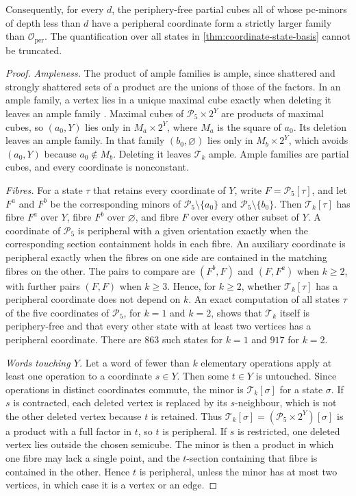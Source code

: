\documentclass[11pt]{article}
\theoremstyle{definition}
\theoremstyle{remark}
\newcommand{\Oper}{\mathcal O_{\mathrm{per}}}
\begin{document}
Consequently, for every \(d\), the periphery-free partial cubes all of whose
pc-minors of depth less than \(d\) have a peripheral coordinate form a
strictly larger family than \(\Oper\).  The
quantification over all states in \cref{thm:coordinate-state-basis} cannot
be truncated.

\begin{proof}
\emph{Ampleness.}  The product of ample families is ample, since
shattered and strongly shattered sets of a product are the unions of
those of the factors.  In an ample family, a vertex lies in a unique
maximal cube exactly when deleting it leaves an ample family
\cite[Lemma~4.1]{ChalopiChepoiMoran22}.  Maximal cubes of
\(\mathcal P_5\times2^Y\) are products of maximal cubes, so \((a_0,Y)\)
lies only in \(M_a\times2^Y\), where \(M_a\) is the square of \(a_0\).  Its
deletion leaves an ample family.  In that family \((b_0,\varnothing)\) lies
only in \(M_b\times2^Y\), which avoids \((a_0,Y)\) because
\(a_0\notin M_b\).  Deleting it leaves \(\mathcal T_k\) ample.  Ample
families are partial cubes, and every coordinate is nonconstant.

\emph{Fibres.}  For a state \(\tau\) that retains every coordinate of
\(Y\), write \(F=\mathcal P_5[\tau]\), and let \(F^a\) and \(F^b\) be the
corresponding minors of \(\mathcal P_5\setminus\{a_0\}\) and
\(\mathcal P_5\setminus\{b_0\}\).  Then \(\mathcal T_k[\tau]\) has fibre
\(F^a\) over \(Y\), fibre \(F^b\) over \(\varnothing\), and fibre \(F\)
over every other subset of \(Y\).  A coordinate of \(\mathcal P_5\) is
peripheral with a given orientation exactly when the corresponding section
containment holds in each fibre.  An auxiliary coordinate is peripheral
exactly when the fibres on one side are contained in the matching fibres
on the other.  The pairs to compare are \((F^b,F)\) and \((F,F^a)\) when
\(k\ge2\), with further pairs \((F,F)\) when \(k\ge3\).  Hence, for
\(k\ge2\), whether \(\mathcal T_k[\tau]\) has a peripheral coordinate does
not depend on \(k\).  An exact computation of all states \(\tau\) of the
five coordinates of \(\mathcal P_5\), for \(k=1\) and \(k=2\), shows that
\(\mathcal T_k\) itself is periphery-free and that every other state with
at least two vertices has a peripheral coordinate.  There are \(863\) such
states for \(k=1\) and \(917\) for \(k=2\).

\emph{Words touching \(Y\).}  Let a word of fewer than \(k\) elementary
operations apply at least one operation to a coordinate \(s\in Y\).  Then
some \(t\in Y\) is untouched.  Since operations in distinct coordinates
commute, the minor is \(\mathcal T_k[\sigma]\) for a state \(\sigma\).  If
\(s\) is contracted, each deleted vertex is replaced by its
\(s\)-neighbour, which is not the other deleted vertex because \(t\) is
retained.  Thus \(\mathcal T_k[\sigma]=(\mathcal P_5\times2^Y)[\sigma]\) is a
product with a full factor in \(t\), so \(t\) is peripheral.  If \(s\) is
restricted, one deleted vertex lies outside the chosen semicube.  The
minor is then a product in which one fibre may lack a single point, and
the \(t\)-section containing that fibre is contained in the other.  Hence
\(t\) is peripheral, unless the minor has at most two vertices, in which
case it is a vertex or an edge.


\end{proof}
\end{document}
